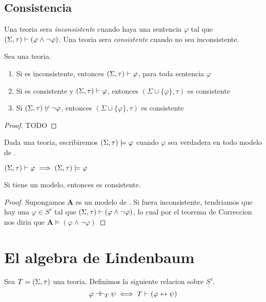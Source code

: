 \subsection{Consistencia}
\begin{definition}
  Una teoria \forder sera \emph{inconsistente} cuando haya una sentencia $\varphi$ tal que $(\Sigma,\tau)\vdash(\varphi\land\neg\varphi)$.
  Una teoria \forder sera \emph{consistente} cuando no sea inconsistente.
\end{definition}

\begin{lemma}
  Sea \forder una teoria. \begin{enumerate}
    \item Si \forder es inconsistente, entonces $(\Sigma,\tau)\vdash\varphi$, para toda sentencia $\varphi$
    \item Si \forder es consistente y $(\Sigma,\tau)\vdash\varphi$, entonces $(\Sigma\cup\{\varphi\},\tau)$ es consistente
    \item Si $(\Sigma,\tau)\not\vdash\neg\varphi$, entonces $(\Sigma\cup\{\varphi\},\tau)$ es consistente
  \end{enumerate}
\end{lemma}
\begin{proof}
  TODO
\end{proof}

\begin{definition}
  Dada \forder una teoria, escribiremos $(\Sigma,\tau)\models\varphi$ cuando $\varphi$ sea verdadera en todo modelo de \forder.
\end{definition}

\begin{theorem}
  $(\Sigma,\tau)\vdash\varphi \implies (\Sigma,\tau)\models\varphi$
\end{theorem}
\noproof
\begin{corollary}
  Si \forder tiene un modelo, entonces \forder es consistente.
\end{corollary}
\begin{proof}
  Supongamos $\mathbf{A}$ es un modelo de \forder. Si \forder fuera inconsistente, tendriamos que hay una $\varphi\in S^\tau$
  tal que $(\Sigma,\tau)\vdash(\varphi\land\neg\varphi)$, lo cual por el teorema de Correccion nos diria que $\mathbf{A}\models(\varphi\land\neg\varphi)$
\end{proof}

\section{El algebra de Lindenbaum}
\begin{definition}
  Sea $T=(\Sigma,\tau)$ una teoria. Definimos la siguiente relacion sobre $S^\tau$.
  $$
  \varphi\dashv\vdash_{T}\psi \iff T\vdash\left(\varphi\leftrightarrow\psi\right)
  $$
\end{definition}

